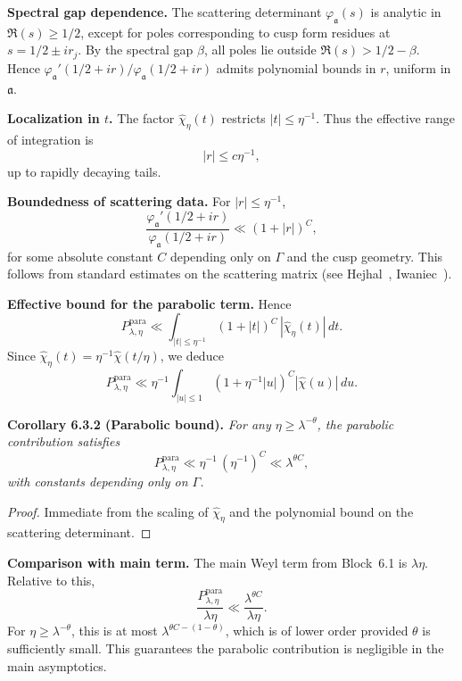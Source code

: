 \medskip

\noindent\textbf{Spectral gap dependence.}
The scattering determinant $\varphi_\mathfrak{a}(s)$ is analytic in $\Re(s)\ge 1/2$, except for poles corresponding to cusp form residues at $s=1/2\pm i r_j$.  
By the spectral gap $\beta$, all poles lie outside $\Re(s)>1/2-\beta$.  
Hence $\varphi_\mathfrak{a}'(1/2+ir)/\varphi_\mathfrak{a}(1/2+ir)$ admits polynomial bounds in $r$, uniform in $\mathfrak{a}$.

\medskip

\noindent\textbf{Localization in $t$.}
The factor $\widehat{\chi}_\eta(t)$ restricts $|t|\le \eta^{-1}$.
Thus the effective range of integration is
\[
  |r|\le c \eta^{-1},
\]
up to rapidly decaying tails.

\medskip

\noindent\textbf{Boundedness of scattering data.}
For $|r|\le \eta^{-1}$,
\[
  \frac{\varphi_\mathfrak{a}'(1/2+ir)}{\varphi_\mathfrak{a}(1/2+ir)} \ll (1+|r|)^C,
\]
for some absolute constant $C$ depending only on $\Gamma$ and the cusp geometry.  
This follows from standard estimates on the scattering matrix (see Hejhal~\cite{Hejhal1983}, Iwaniec~\cite{Iwaniec2002}).

\medskip

\noindent\textbf{Effective bound for the parabolic term.}
Hence
\[
  P_{\lambda,\eta}^{\text{para}} \ll \int_{|t|\le \eta^{-1}} (1+|t|)^C\, |\widehat{\chi}_\eta(t)|\, dt.
\]
Since $\widehat{\chi}_\eta(t) = \eta^{-1} \widehat{\chi}(t/\eta)$,
we deduce
\[
  P_{\lambda,\eta}^{\text{para}} \ll \eta^{-1}\int_{|u|\le 1} (1+\eta^{-1}|u|)^C |\widehat{\chi}(u)|\, du.
\]

\medskip

\noindent\textbf{Corollary 6.3.2 (Parabolic bound).}
\emph{For any $\eta \ge \lambda^{-\theta}$,
the parabolic contribution satisfies}
\[
  P_{\lambda,\eta}^{\text{para}} \ll \eta^{-1}\, (\eta^{-1})^C \ll \lambda^{\theta C},
\]
\emph{with constants depending only on $\Gamma$.}

\begin{proof}
Immediate from the scaling of $\widehat{\chi}_\eta$ and the polynomial bound on the scattering determinant.
\end{proof}

\medskip

\noindent\textbf{Comparison with main term.}
The main Weyl term from Block~6.1 is $\lambda \eta$.
Relative to this,
\[
  \frac{P_{\lambda,\eta}^{\text{para}}}{\lambda \eta} \ll \frac{\lambda^{\theta C}}{\lambda \eta}.
\]
For $\eta \ge \lambda^{-\theta}$,
this is at most $\lambda^{\theta C - (1-\theta)}$,
which is of lower order provided $\theta$ is sufficiently small.
This guarantees the parabolic contribution is negligible in the main asymptotics.

